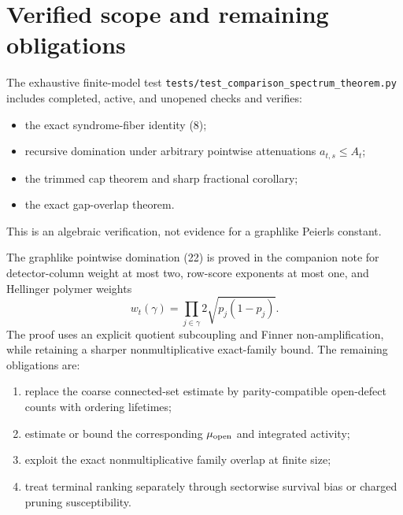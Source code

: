 \documentclass[11pt]{article}
\newcommand{\1}{\mathbf 1}
\begin{document}
\section{Verified scope and remaining obligations}

The exhaustive finite-model test
\texttt{tests/test\_comparison\_spectrum\_theorem.py} includes completed,
active, and unopened checks and verifies:
\begin{itemize}
\item the exact syndrome-fiber identity (8);
\item recursive domination under arbitrary pointwise attenuations
      \(a_{t,s}\le A_t\);
\item the trimmed cap theorem and sharp fractional corollary;
\item the exact gap-overlap theorem.
\end{itemize}
This is an algebraic verification, not evidence for a graphlike Peierls
constant.

The graphlike pointwise domination (22) is proved in the companion note for
detector-column weight at most two, row-score exponents at most one, and
Hellinger polymer weights
\[
 w_t(\gamma)=
 \prod_{j\in\gamma}2\sqrt{p_j(1-p_j)}.
\]
The proof uses an explicit quotient subcoupling and Finner
non-amplification, while retaining a sharper nonmultiplicative exact-family
bound.  The remaining obligations are:
\begin{enumerate}
\item replace the coarse connected-set estimate by parity-compatible
      open-defect counts with ordering lifetimes;
\item estimate or bound the corresponding \(\mu_{\rm open}\) and integrated
      activity;
\item exploit the exact nonmultiplicative family overlap at finite size;
\item treat terminal ranking separately through sectorwise survival bias or
      charged pruning susceptibility.
\end{enumerate}
\end{document}
